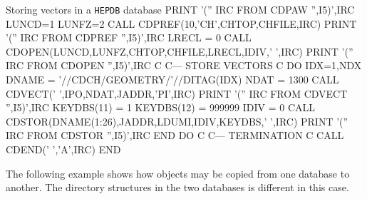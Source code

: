 \begin{XMPt}{Storing vectors in a {\tt HEPDB} database}
      PRINT '('' IRC FROM CDPAW '',I5)',IRC
      LUNCD=1
      LUNFZ=2
      CALL CDPREF(10,'CH',CHTOP,CHFILE,IRC)
      PRINT '('' IRC FROM CDPREF '',I5)',IRC
      LRECL = 0
      CALL CDOPEN(LUNCD,LUNFZ,CHTOP,CHFILE,LRECL,IDIV,' ',IRC)
      PRINT '('' IRC FROM CDOPEN '',I5)',IRC
C
C---  STORE VECTORS
C
      DO IDX=1,NDX
          DNAME = '//CDCH/GEOMETRY/'//DITAG(IDX)
          NDAT = 1300
          CALL CDVECT(' ',IPO,NDAT,JADDR,'PI',IRC)
          PRINT '('' IRC FROM CDVECT '',I5)',IRC
          KEYDBS(11) = 1
          KEYDBS(12) = 999999
          IDIV = 0
          CALL CDSTOR(DNAME(1:26),JADDR,LDUMI,IDIV,KEYDBS,' ',IRC)
          PRINT '('' IRC FROM CDSTOR '',I5)',IRC
      END DO
C
C--- TERMINATION
C
      CALL CDEND(' ','A',IRC)
      END
\end{XMPt}

The following example shows how objects may be copied from
one database to another. The directory structures in the two
databases is different in this case.

